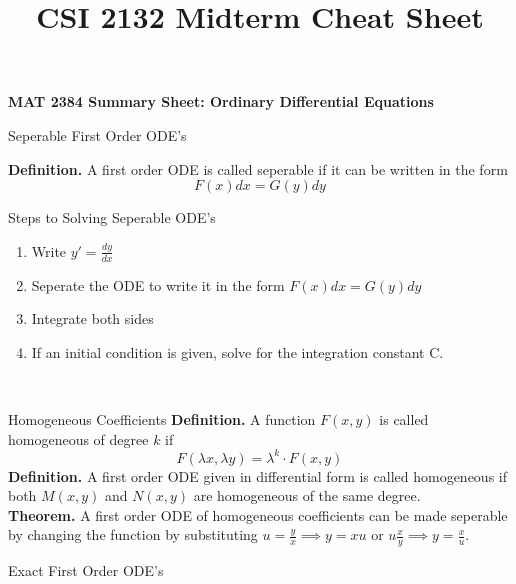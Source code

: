 \documentclass{article}
\title{CSI 2132 Midterm Cheat Sheet}
\begin{document}
\begin{center}{\large{\textbf{MAT 2384 Summary Sheet: Ordinary Differential Equations}}}\\
\end{center}




\begin{multicols*}{3}
\begin{blackbox}{Seperable First Order ODE's}
    {\scriptsize
    
    \textbf{Definition.} A first order ODE is called seperable if it can be written in the form \\[-2ex]
    \[F(x)dx = G(y)dy\]
        \begin{redbox}{Steps to Solving Seperable ODE's}
            \begin{enumerate}[align=left]
                \item Write $y' = \frac{dy}{dx}$
                \item Seperate the ODE to write it in the form $F(x)dx = G(y)dy$
                \item Integrate both sides
                \item If an initial condition is given, solve for the integration constant C. 
            \end{enumerate}
        \end{redbox}\\[-2ex]
    }
\end{blackbox}
\begin{blackbox}{Homogeneous Coefficients}
    {\scriptsize
    \textbf{Definition.} A function $F(x,y)$ is called homogeneous of degree $k$ if \\[-2ex]
    \[F(\lambda x, \lambda y) = \lambda^k \cdot F(x,y)\]
    \textbf{Definition.} A first order ODE given in differential form is called homogeneous if both $M(x,y)$ and $N(x,y)$ are homogeneous of the same degree.\\[1ex]
    \textbf{Theorem.} A first order ODE of homogeneous coefficients can be made seperable by changing the function by substituting $u = \frac{y}{x} \implies y = xu$ or $u \frac{x}{y} \implies y = \frac{x}{u}$. 
    }
\end{blackbox}
\begin{blackbox}{Exact First Order ODE's}
    {\scriptsize
    
}
\end{blackbox}
\end{multicols*}
\end{document}
